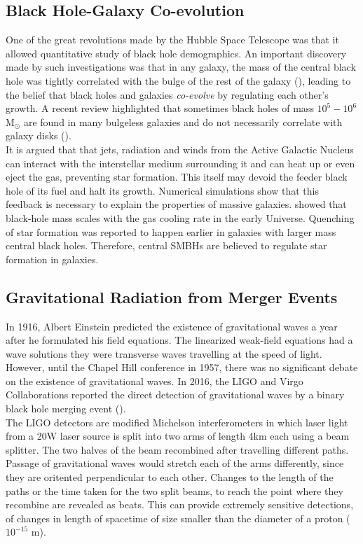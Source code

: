 \documentclass[twocolumn]{aastex63}
\begin{document}
\subsection{Black Hole-Galaxy Co-evolution} \label{subsec:coevolution}
One of the great revolutions made by the Hubble Space Telescope was that it allowed quantitative study of black hole demographics. An important discovery made by such investigations was that in any galaxy, the mass of the central black hole was tightly correlated with the bulge of the rest of the galaxy (\cite{2003ApJ...589L..21M}), leading to the belief that black holes and galaxies \textit{co-evolve} by regulating each other's growth. A recent review highlighted that sometimes black holes of mass $10^5-10^6$M$_{\odot}$ are found in many bulgeless galaxies and do not necessarily correlate with galaxy disks (\cite{2013ARA&A..51..511K}).\\

It is argued that that jets, radiation and winds from the Active Galactic Nucleus can interact with the interstellar medium surrounding it and can heat up or even eject the gas, preventing star formation. This itself may devoid the feeder black hole of its fuel and halt its growth. Numerical simulations show that this feedback is necessary to explain the properties of massive galaxies. \cite{Mart_n_Navarro_2018} showed that black-hole mass scales with the gas cooling rate in the early Universe. Quenching of star formation was reported to happen earlier in galaxies with larger mass central black holes. Therefore, central SMBHs are believed to regulate star formation in galaxies.

\subsection{Gravitational Radiation from Merger Events}
In 1916, Albert Einstein predicted the existence of gravitational waves a year after he formulated his field equations. The linearized weak-field equations had a wave solutions \textemdash they were transverse waves travelling at the speed of light. However, until the Chapel Hill conference in 1957, there was no significant debate on the existence of gravitational waves. In 2016, the LIGO and Virgo Collaborations reported the direct detection of gravitational waves by a binary black hole merging event (\cite{PhysRevLett.116.061102}).\\

The LIGO detectors are modified Michelson interferometers in which laser light from a 20W laser source is split into two arms of length 4km each using a beam splitter. The two halves of the beam recombined after travelling different paths.  Passage of gravitational waves would stretch each of the arms differently, since they are oritented perpendicular to each other. Changes to the length of the paths or the time taken for the two split beams, to reach the point where they recombine are revealed as beats. This can provide extremely sensitive detections, of changes in length of spacetime of size smaller than the diameter of a proton ($10^{-15}$ m).
\end{document}

